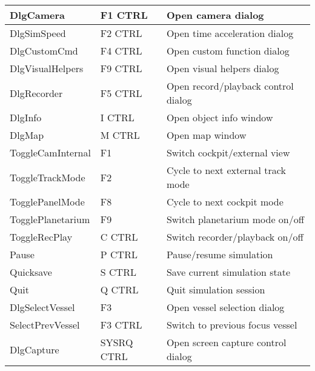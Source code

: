 \documentclass[Orbiter User Manual.tex]{subfiles}
\begin{document}
\begin{longtable}{ |p{}|p{}|p{}| }
	DlgCamera & F1 CTRL & Open camera dialog\\
	\hline\rule{0pt}{2ex}
	DlgSimSpeed & F2 CTRL & Open time acceleration dialog\\
	\hline\rule{0pt}{2ex}
	DlgCustomCmd & F4 CTRL & Open custom function dialog\\
	\hline\rule{0pt}{2ex}
	DlgVisualHelpers & F9 CTRL & Open visual helpers dialog\\
	\hline\rule{0pt}{2ex}
	DlgRecorder & F5 CTRL & Open record/playback control dialog\\
	\hline\rule{0pt}{2ex}
	DlgInfo & I CTRL & Open object info window\\
	\hline\rule{0pt}{2ex}
	DlgMap & M CTRL & Open map window\\
	\hline\rule{0pt}{2ex}
	ToggleCamInternal & F1 & Switch cockpit/external view\\
	\hline\rule{0pt}{2ex}
	ToggleTrackMode & F2 & Cycle to next external track mode\\
	\hline\rule{0pt}{2ex}
	TogglePanelMode & F8 & Cycle to next cockpit mode\\
	\hline\rule{0pt}{2ex}
	TogglePlanetarium & F9 & Switch planetarium mode on/off\\
	\hline\rule{0pt}{2ex}
	ToggleRecPlay & C CTRL & Switch recorder/playback on/off\\
	\hline\rule{0pt}{2ex}
	Pause & P CTRL & Pause/resume simulation\\
	\hline\rule{0pt}{2ex}
	Quicksave & S CTRL & Save current simulation state\\
	\hline\rule{0pt}{2ex}
	Quit & Q CTRL & Quit simulation session\\
	\hline\rule{0pt}{2ex}
	DlgSelectVessel & F3 & Open vessel selection dialog\\
	\hline\rule{0pt}{2ex}
	SelectPrevVessel & F3 CTRL & Switch to previous focus vessel\\
	\hline\rule{0pt}{2ex}
	DlgCapture & SYSRQ CTRL & Open screen capture control dialog\\
	\hline
	\end{longtable}
\end{document}
